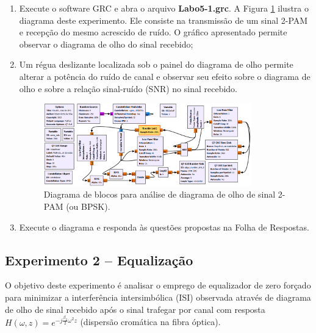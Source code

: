 \documentclass[12pt,addpoints]{exam}
\begin{document}
\begin{enumerate}    
    \item Execute o software GRC e abra o arquivo \textbf{Labo5-1.grc}. A Figura \ref{fig:GRC_5-1} ilustra o diagrama deste experimento. Ele consiste na transmissão de um sinal 2-PAM e recepção do mesmo acrescido de ruído. O gráfico apresentado permite observar o diagrama de olho do sinal recebido;
    \item Um régua deslizante localizada sob o painel do diagrama de olho permite alterar a potência do ruído de canal e observar seu efeito sobre o diagrama de olho e sobre a relação sinal-ruído (SNR) no sinal recebido.
    \begin{figure}[htb]
        \centering
        \includegraphics[width=0.85\textwidth]{Figuras/Labo5-1}
        \caption{Diagrama de blocos para análise de diagrama de olho de sinal 2-PAM (ou BPSK).}
        \label{fig:GRC_5-1}
    \end{figure}
  \item Execute o diagrama e responda às questões propostas na Folha de Respostas.
\end{enumerate}

\subsection{Experimento 2 -- Equalização}

O objetivo deste experimento é analisar o emprego de equalizador de zero forçado para minimizar a interferência intersimbólica (ISI) observada através de diagrama de olho de sinal recebido após o sinal trafegar por canal com resposta $H(\omega, z) = e^{-j\frac{\beta_2}{2} \omega^2z}$ (dispersão cromática na fibra óptica).
\end{document}
